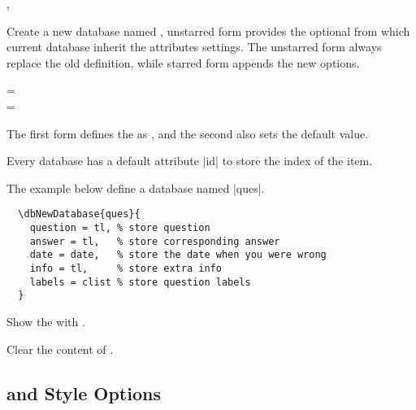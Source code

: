 \documentclass[full]{l3doc}
\def\orbar{\textup{\textbar}}
\begin{document}
\begin{documentation}
\begin{function}[added=2022-01-05, updated=2022-01-10]{\dbNewDatabase, \dbNewDatabase*}
\end{function}

Create a new database named , unstarred form provides the optional
 from which current database inherit the attributes settings.
The unstarred form always replace the old definition, while starred form
appends the new options.

\begin{syntax}
   =  \\
   = \orbar{}
\end{syntax}

The first form defines the  as , and the second also
sets the default value.

\begin{note}
  Every database has a default attribute |id| to store the index of the item.
\end{note}

The example below define a database named |ques|.
\begin{verbatim}
  \dbNewDatabase{ques}{
    question = tl, % store question
    answer = tl,   % store corresponding answer
    date = date,   % store the date when you were wrong
    info = tl,     % store extra info
    labels = clist % store question labels
  }
\end{verbatim}

\begin{function}[added=2022-01-05]{\dbshow}
  \begin{syntax}
      
  \end{syntax}

  Show the  with .
\end{function}

\begin{function}[added=2022-01-07]{\dbclear}
  \begin{syntax}
     
  \end{syntax}

  Clear the content of .
\end{function}

\subsection{ and Style Options}


\end{documentation}
\end{document}
